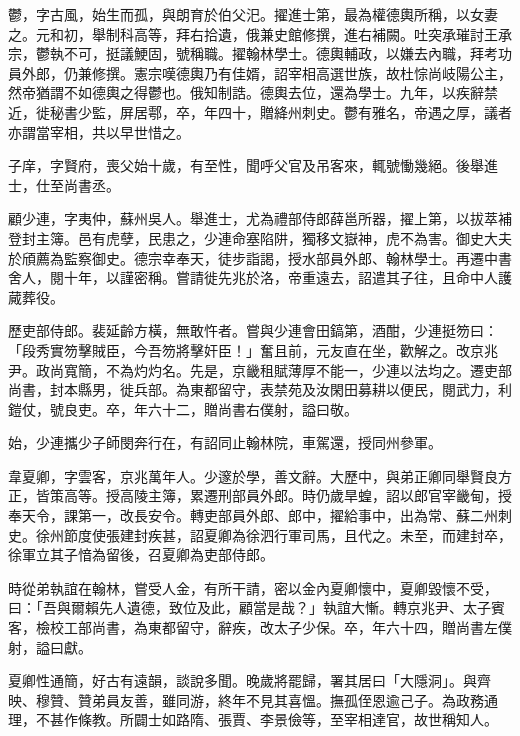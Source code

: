\begin{pinyinscope}
 鬱，字古風，始生而孤，與朗育於伯父汜。擢進士第，最為權德輿所稱，以女妻之。元和初，舉制科高等，拜右拾遺，俄兼史館修撰，進右補闕。吐突承璀討王承宗，鬱執不可，挺議鯁固，號稱職。擢翰林學士。德輿輔政，以嫌去內職，拜考功員外郎，仍兼修撰。憲宗嘆德輿乃有佳婿，詔宰相高選世族，故杜悰尚岐陽公主，然帝猶謂不如德輿之得鬱也。俄知制誥。德輿去位，還為學士。九年，以疾辭禁近，徙秘書少監，屏居鄠，卒，年四十，贈絳州刺史。鬱有雅名，帝遇之厚，議者亦謂當宰相，共以早世惜之。



 子庠，字賢府，喪父始十歲，有至性，聞呼父官及吊客來，輒號慟幾絕。後舉進士，仕至尚書丞。



 顧少連，字夷仲，蘇州吳人。舉進士，尤為禮部侍郎薛邕所器，擢上第，以拔萃補登封主簿。邑有虎孽，民患之，少連命塞陷阱，獨移文嶽神，虎不為害。御史大夫於頎薦為監察御史。德宗幸奉天，徒步詣謁，授水部員外郎、翰林學士。再遷中書舍人，閱十年，以謹密稱。嘗請徙先兆於洛，帝重遠去，詔遣其子往，且命中人護蕆葬役。



 歷吏部侍郎。裴延齡方橫，無敢忤者。嘗與少連會田鎬第，酒酣，少連挺笏曰：「段秀實笏擊賊臣，今吾笏將擊奸臣！」奮且前，元友直在坐，歡解之。改京兆尹。政尚寬簡，不為灼灼名。先是，京畿租賦薄厚不能一，少連以法均之。遷吏部尚書，封本縣男，徙兵部。為東都留守，表禁苑及汝閑田募耕以便民，閱武力，利鎧仗，號良吏。卒，年六十二，贈尚書右僕射，謚曰敬。



 始，少連攜少子師閔奔行在，有詔同止翰林院，車駕還，授同州參軍。



 韋夏卿，字雲客，京兆萬年人。少邃於學，善文辭。大歷中，與弟正卿同舉賢良方正，皆策高等。授高陵主簿，累遷刑部員外郎。時仍歲旱蝗，詔以郎官宰畿甸，授奉天令，課第一，改長安令。轉吏部員外郎、郎中，擢給事中，出為常、蘇二州刺史。徐州節度使張建封疾甚，詔夏卿為徐泗行軍司馬，且代之。未至，而建封卒，徐軍立其子愔為留後，召夏卿為吏部侍郎。



 時從弟執誼在翰林，嘗受人金，有所干請，密以金內夏卿懷中，夏卿毀懷不受，曰：「吾與爾賴先人遺德，致位及此，顧當是哉？」執誼大慚。轉京兆尹、太子賓客，檢校工部尚書，為東都留守，辭疾，改太子少保。卒，年六十四，贈尚書左僕射，謚曰獻。



 夏卿性通簡，好古有遠韻，談說多聞。晚歲將罷歸，署其居曰「大隱洞」。與齊映、穆贊、贊弟員友善，雖同游，終年不見其喜慍。撫孤侄恩逾己子。為政務通理，不甚作條教。所闢士如路隋、張賈、李景儉等，至宰相達官，故世稱知人。




\end{pinyinscope}
